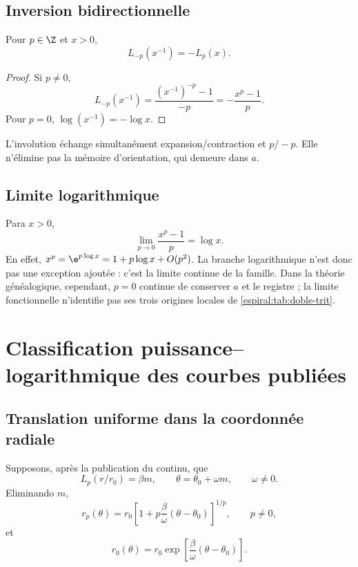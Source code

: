 \section{Inversion bidirectionnelle}

\begin{proposition}
Pour \(p\in\Z\) et \(x>0\),
\begin{equation}
 L_{-p}(x^{-1})=-L_p(x).
 \label{espiral:eq:lp-inversion}
\end{equation}
\end{proposition}
\begin{proof}
Si \(p\neq0\),
\[
 L_{-p}(x^{-1})
 =\frac{(x^{-1})^{-p}-1}{-p}
 =-\frac{x^p-1}{p}.
\]
Pour \(p=0\), \(\log(x^{-1})=-\log x\).
\end{proof}

L'involution échange simultanément expansion/contraction et \(p/-p\). Elle n'élimine pas la mémoire d'orientation, qui demeure dans \(a\).

\section{Limite logarithmique}

Para \(x>0\),
\[
 \lim_{p\to0}\frac{x^p-1}{p}=\log x.
\]
En effet, \(x^p=\e^{p\log x}=1+p\log x+O(p^2)\). La branche logarithmique n'est donc pas une exception ajoutée : c'est la limite continue de la famille. Dans la théorie généalogique, cependant, \(p=0\) continue de conserver \(a\) et le registre ; la limite fonctionnelle n'identifie pas ses trois origines locales de \cref{espiral:tab:doble-trit}.

\chapter{Classification puissance--logarithmique des courbes publiées}

\section{Translation uniforme dans la coordonnée radiale}

Supposons, après la publication du continu, que
\[
 L_p(r/r_0)=\beta m,
 \qquad
 \theta=\theta_0+\omega m,
 \qquad \omega\neq0.
\]
Eliminando \(m\),
\begin{equation}
 r_p(\theta)=r_0
 \left[1+p\frac{\beta}{\omega}
 (\theta-\theta_0)\right]^{1/p},
 \qquad p\neq0,
 \label{espiral:eq:familia-potencia}
\end{equation}
et
\begin{equation}
 r_0(\theta)=r_0
 \exp\!\left[\frac{\beta}{\omega}
 (\theta-\theta_0)\right].
 \label{espiral:eq:familia-log}
\end{equation}

